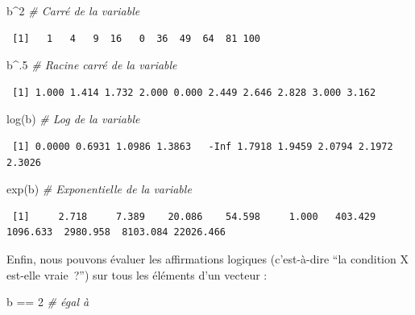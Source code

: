 \documentclass[
  12pt,
]{book}
\newenvironment{Shaded}{\begin{snugshade}}{\end{snugshade}}
\newcommand{\CommentTok}[1]{\textcolor[rgb]{0.56,0.35,0.01}{\textit{#1}}}
\newcommand{\DecValTok}[1]{\textcolor[rgb]{0.00,0.00,0.81}{#1}}
\newcommand{\FunctionTok}[1]{\textcolor[rgb]{0.00,0.00,0.00}{#1}}
\newcommand{\NormalTok}[1]{#1}
\newcommand{\SpecialCharTok}[1]{\textcolor[rgb]{0.00,0.00,0.00}{#1}}
\begin{document}
\begin{Shaded}
\begin{Highlighting}[]
\NormalTok{b}\SpecialCharTok{\^{}}\DecValTok{2} \CommentTok{\# Carré de la variable}
\end{Highlighting}
\end{Shaded}

\begin{verbatim}
 [1]   1   4   9  16   0  36  49  64  81 100
\end{verbatim}

\begin{Shaded}
\begin{Highlighting}[]
\NormalTok{b}\SpecialCharTok{\^{}}\NormalTok{.}\DecValTok{5} \CommentTok{\# Racine carré de la variable}
\end{Highlighting}
\end{Shaded}

\begin{verbatim}
 [1] 1.000 1.414 1.732 2.000 0.000 2.449 2.646 2.828 3.000 3.162
\end{verbatim}

\begin{Shaded}
\begin{Highlighting}[]
\FunctionTok{log}\NormalTok{(b) }\CommentTok{\# Log de la variable}
\end{Highlighting}
\end{Shaded}

\begin{verbatim}
 [1] 0.0000 0.6931 1.0986 1.3863   -Inf 1.7918 1.9459 2.0794 2.1972 2.3026
\end{verbatim}

\begin{Shaded}
\begin{Highlighting}[]
\FunctionTok{exp}\NormalTok{(b) }\CommentTok{\# Exponentielle de la variable}
\end{Highlighting}
\end{Shaded}

\begin{verbatim}
 [1]     2.718     7.389    20.086    54.598     1.000   403.429  1096.633  2980.958  8103.084 22026.466
\end{verbatim}

Enfin, nous pouvons évaluer les affirmations logiques (c'est-à-dire ``la condition X est-elle vraie~?'') sur tous les éléments d'un vecteur :

\begin{Shaded}
\begin{Highlighting}[]
\NormalTok{b }\SpecialCharTok{==} \DecValTok{2} \CommentTok{\# égal à}
\end{Highlighting}
\end{Shaded}
\end{document}
